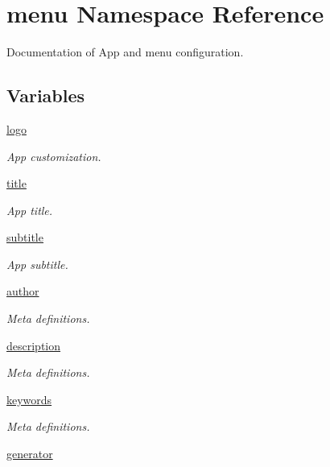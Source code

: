 \hypertarget{namespacemenu}{}\section{menu Namespace Reference}
\label{namespacemenu}


Documentation of App and menu configuration.  


\subsection*{Variables}
\begin{DoxyCompactItemize}
\item 
\hyperlink{namespacemenu_acd70fc1c344a72f53b7528186d108102}{logo}
\begin{DoxyCompactList}\small\item\em App customization. \end{DoxyCompactList}\item 
\hyperlink{namespacemenu_ab998e7dc6cc33b3fe815797c6134b042}{title}
\begin{DoxyCompactList}\small\item\em App title. \end{DoxyCompactList}\item 
\hyperlink{namespacemenu_a440d776515ac077840e8d9389c071b98}{subtitle}
\begin{DoxyCompactList}\small\item\em App subtitle. \end{DoxyCompactList}\item 
\hyperlink{namespacemenu_a2ec9f4f7a34fe891cd2319418749f622}{author}
\begin{DoxyCompactList}\small\item\em Meta definitions. \end{DoxyCompactList}\item 
\hyperlink{namespacemenu_ad1fc749539970e324fa264c8de439fa2}{description}
\begin{DoxyCompactList}\small\item\em Meta definitions. \end{DoxyCompactList}\item 
\hyperlink{namespacemenu_a833b19290ee00e303b9e4777c7ac5a98}{keywords}
\begin{DoxyCompactList}\small\item\em Meta definitions. \end{DoxyCompactList}\item 
\hyperlink{namespacemenu_ae6ac216b7a7bba4fee339fe4de8a3a1b}{generator}

\end{DoxyCompactItemize}
